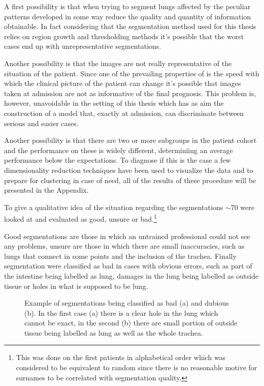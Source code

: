 A first possibility is that when trying to segment lungs affected by \covid the peculiar patterns developed in some way reduce the quality and quantity of information obtainable.
In fact considering that the segmentation method used for this thesis relies on region growth and thresholding methods it's possible that the worst cases end up with unrepresentative segmentations.

Another possibility is that the images are not really representative of the situation of the patient. Since one of the prevailing properties of \covid is the speed with which the clinical picture of the patient can change it's possible that images taken at admission are not as informative of the final prognosis. This problem is, however, unavoidable in the setting of this thesis which has as aim the construction of a model that, exactly at admission, can discriminate between serious and easier cases.

Another possibility is that there are two or more subgroups in the patient cohort and the performance on these is widely different, determiniing an average performance below the expectations.
To diagnose if this is the case a few dimensionality reduction techniques have been used to visualize the data and to prepare for clustering in case of need, all of the results of these procedure will be presented in the Appendix.

To give a qualitative idea of the situation regarding the segmentations $\sim$70 were looked at and evaluated as good, unsure or bad.\footnote{This was done on the first patients in alphabetical order which was considered to be equivalent to random since there is no reasonable motive for surnames to be correlated with segmentation quality.}

Good segmentations are those in which an untrained professional could not see any problems, unsure are those in which there are small inaccuracies, such as lungs that connect in some points and the inclusion of the trachea. 
Finally segmentation were classified as bad in cases with obvious errors, such as part of the intestine being labelled as lung, damages in the lung being labelled as outside tissue or holes in what is supposed to be lung.

\begin{figure}[H]
\centering
	\newline
        \caption{Example of segmentations being classified as bad (a) and dubious (b). In the first case (a) there is a clear hole in the lung which cannot be exact, in the second (b) there are small portion of outside tissue being labelled as lung as well as the whole trachea.}\label{fig:ExampleSeg}
\end{figure}

